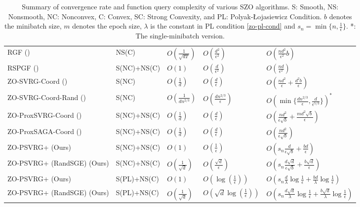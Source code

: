 \begin{table*}[t]
\begin{center}
\begin{adjustbox}{width=\textwidth}
\begin{tabular}{ |l|l|l|l|l| }
 RGF (\cite{nesterov2017random}) & NS(C) & $O\left(\frac{1}{\sqrt{dT}}\right)$ & $O\left(\frac{d^2}{\epsilon^2}\right)$ &$O\left(\frac{nd^2}{\epsilon^2}b\right)$\\
 RSPGF (\cite{ghadimi2016accelerated}) & S(NC)+NS(C) & $O\left(1\right)$ & $O\left(\frac{d}{\epsilon^2}\right)$ &$O\left(\frac{nd}{\epsilon^2}\right)$\\ 
 ZO-SVRG-Coord (\cite{liu2018zeroth}) & S(NC)& $O\left(\frac{1}{{d}}\right)$ & $O\left(\frac{d}{\epsilon}\right)$ & $O(\frac{nd^2}{\epsilon}+\frac{d^2b}{\epsilon})$\\
 ZO-SVRG-Coord-Rand (\cite{ji2019improved}) & S(NC)& $O\left(\frac{1}{{dn^{2/3}}}\right)$ & $O\left(\frac{dn^{2/3}}{\epsilon}\right)$ & $O(\min\{\frac{dn^{2/3}}{\epsilon},\frac{d}{\epsilon^{5/3}}\})^{*}$\\
  ZO-ProxSVRG-Coord (\cite{huang2019faster}) & S(NC)+NS(C) & $O\left(\frac{1}{{d}}\right)$ & $O\left(\frac{d}{\epsilon}\right)$ & $O(\frac{nd^2}{\epsilon\sqrt{b}}+\frac{md^2\sqrt{b}}{\epsilon})$\\
   ZO-ProxSAGA-Coord (\cite{huang2019faster}) & S(NC)+NS(C)& $O\left(\frac{1}{{d}}\right)$ & $O\left(\frac{d}{\epsilon}\right)$ & $O(\frac{nd^2}{\epsilon\sqrt{b}})$\\
   ZO-PSVRG+ (Ours)  & S(NC)+NS(C) & $O\left(1\right)$ & $O\left(\frac{1}{\epsilon}\right)$ & $O\left(s_n\frac{d}{\epsilon \sqrt{b}}+\frac{bd}{\epsilon}\right)$\\
   ZO-PSVRG+ (RandSGE) (Ours)  & S(NC)+NS(C) & $O\left(\frac{1}{\sqrt{d}}\right)$ & $O\left(\frac{\sqrt{d}}{\epsilon}\right)$ & $O\left(s_n\frac{d\sqrt{d}}{\epsilon \sqrt{b}}+\frac{b\sqrt{d}}{\epsilon}\right)$\\
   ZO-PSVRG+ (Ours) & S(PL)+NS(C) & $O\left(1\right)$ & $O\left(\log(\frac{1}{\epsilon})\right)$ & {$O(s_n \frac{d}{\lambda}\log\frac{1}{\epsilon}+\frac{bd}{\lambda}\log\frac{1}{\epsilon})$}\\
   ZO-PSVRG+ (RandSGE) (Ours) & S(PL)+NS(C) & $O\left(\frac{1}{\sqrt{d}}\right)$ & $O\left(\sqrt{d}\log(\frac{1}{\epsilon})\right)$ & {$O(s_n\frac{d\sqrt{d}}{\lambda}\log\frac{1}{\epsilon}+\frac{b\sqrt{d}}{\lambda}\log\frac{1}{\epsilon})$}\\
 \hline
\end{tabular}
\end{adjustbox}
\caption{Summary of convergence rate and function query complexity of various SZO algorithms. S: Smooth, NS: Nonsmooth, NC: Nonconvex, C: Convex, SC: Strong Convexity, and PL: Polyak-Łojasiewicz Condition. $b$ denotes the minibatch size, $m$ denotes the epoch size, $\lambda$ is the constant in PL condition \eqref{zo-pl-cond} and $s_n = \min\{n, \frac{1}{\epsilon}\}$. *: The single-minibatch version.}
\label{table-compare}
\end{center}
\end{table*}

